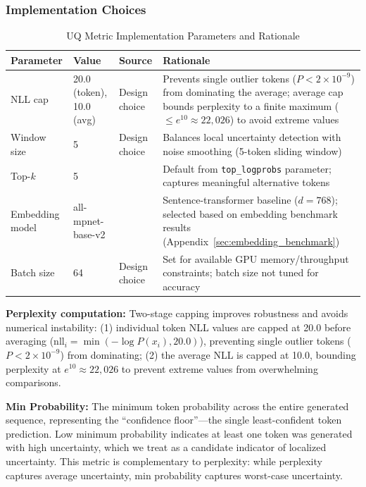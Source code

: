 \subsubsection{Implementation Choices}

\begin{table}[H]
\centering
\caption{UQ Metric Implementation Parameters and Rationale}
\label{tab:uq_params}
\footnotesize
\begin{tabularx}{\textwidth}{@{}l l l X@{}}
\toprule
\textbf{Parameter} & \textbf{Value} & \textbf{Source} & \textbf{Rationale} \\
\midrule
NLL cap & 20.0 (token), 10.0 (avg) & Design choice & Prevents single outlier tokens ($P < 2 \times 10^{-9}$) from dominating the average; average cap bounds perplexity to a finite maximum ($\leq e^{10} \approx 22{,}026$) to avoid extreme values \\
Window size & 5 & Design choice & Balances local uncertainty detection with noise smoothing (5-token sliding window) \\
Top-$k$ & 5 & \cite{openai2024api} & Default from \texttt{top\_logprobs} parameter; captures meaningful alternative tokens \\
Embedding model & all-mpnet-base-v2 & \cite{muennighoff2023mteb} & Sentence-transformer baseline ($d=768$); selected based on embedding benchmark results (Appendix~\ref{sec:embedding_benchmark}) \\
Batch size & 64 & Design choice & Set for available GPU memory/throughput constraints; batch size not tuned for accuracy \\
\bottomrule
\end{tabularx}
\end{table}

\textbf{Perplexity computation:} Two-stage capping improves robustness and avoids numerical instability: (1) individual token NLL values are capped at 20.0 before averaging ($\text{nll}_i = \min(-\log P(x_i), 20.0)$), preventing single outlier tokens ($P < 2 \times 10^{-9}$) from dominating; (2) the average NLL is capped at 10.0, bounding perplexity at $e^{10} \approx 22{,}026$ to prevent extreme values from overwhelming comparisons.

\textbf{Min Probability:} The minimum token probability across the entire generated sequence, representing the ``confidence floor''---the single least-confident token prediction. Low minimum probability indicates at least one token was generated with high uncertainty, which we treat as a candidate indicator of localized uncertainty. This metric is complementary to perplexity: while perplexity captures average uncertainty, min probability captures worst-case uncertainty.

